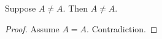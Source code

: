\begin{proposition}\label{phase5_contradiction}
    Suppose $A \neq A$.
    Then $A \neq A$.
\end{proposition}
\begin{proof}
    Assume $A = A$.
    Contradiction.
\end{proof}
